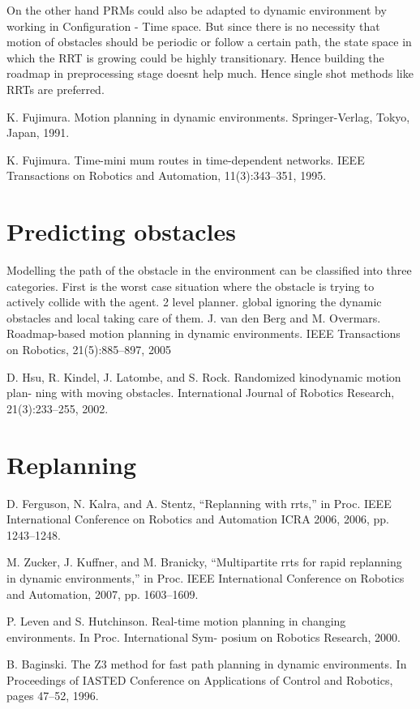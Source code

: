 \documentclass[MTech]{iitmdiss}
\begin{document}
On the other hand PRMs could also be adapted to dynamic environment by working in Configuration - Time space. But since there is no necessity that motion of obstacles should be periodic or follow a certain path, the state space in which the RRT is growing could be highly transitionary. Hence building the roadmap in preprocessing stage doesnt help much. Hence single shot methods like RRTs are preferred. 


K. Fujimura. Motion planning in dynamic environments. Springer-Verlag, Tokyo, Japan, 1991.

K. Fujimura. Time-mini mum routes in time-dependent networks. IEEE Transactions
on Robotics and Automation, 11(3):343–351, 1995.
 
\section{Predicting obstacles} 

Modelling the path of the obstacle in the environment can be classified into three categories. First is the worst case situation where the obstacle is trying to actively collide with the agent.
 2 level planner. global ignoring the dynamic obstacles and local taking care of them. 
J. van den Berg and M. Overmars. Roadmap-based motion planning in dynamic environments. IEEE Transactions on Robotics, 21(5):885–897, 2005  
 
D. Hsu, R. Kindel, J. Latombe, and S. Rock. Randomized kinodynamic motion plan- ning with moving obstacles. International Journal of Robotics Research, 21(3):233–255, 2002.
 
 
 
 \section{Replanning}
 
 
D. Ferguson, N. Kalra, and A. Stentz, “Replanning with rrts,” in Proc. IEEE International Conference on Robotics and Automation ICRA 2006, 2006, pp. 1243–1248.


 M. Zucker, J. Kuffner, and M. Branicky, “Multipartite rrts for rapid replanning in dynamic environments,” in Proc. IEEE International Conference on Robotics and Automation, 2007, pp. 1603–1609. 
 
 
P. Leven and S. Hutchinson. Real-time motion planning in changing environments. In Proc. International Sym- posium on Robotics Research, 2000. 
 
 B. Baginski. The Z3 method for fast path planning in dynamic environments. In Proceedings of IASTED Conference on Applications of Control and Robotics, pages 47–52, 1996.
 
\end{document}
